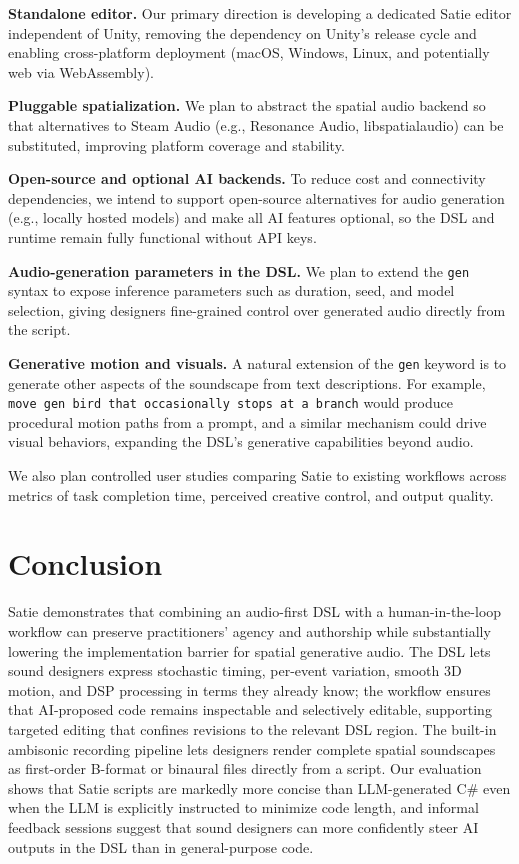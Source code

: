 \documentclass[sigconf,anonymous,review]{nimeart}
\begin{document}
\textbf{Standalone editor.} Our primary direction is developing a dedicated Satie editor independent of Unity, removing the dependency on Unity's release cycle and enabling cross-platform deployment (macOS, Windows, Linux, and potentially web via WebAssembly).

\textbf{Pluggable spatialization.} We plan to abstract the spatial audio backend so that alternatives to Steam Audio (e.g., Resonance Audio, libspatialaudio) can be substituted, improving platform coverage and stability.

\textbf{Open-source and optional AI backends.} To reduce cost and connectivity dependencies, we intend to support open-source alternatives for audio generation (e.g., locally hosted models) and make all AI features optional, so the DSL and runtime remain fully functional without API keys.

\textbf{Audio-generation parameters in the DSL.} We plan to extend the \texttt{gen} syntax to expose inference parameters such as duration, seed, and model selection, giving designers fine-grained control over generated audio directly from the script.

\textbf{Generative motion and visuals.} A natural extension of the \texttt{gen} keyword is to generate other aspects of the soundscape from text descriptions. For example, \texttt{move gen bird that occasionally stops at a branch} would produce procedural motion paths from a prompt, and a similar mechanism could drive visual behaviors, expanding the DSL's generative capabilities beyond audio.

We also plan controlled user studies comparing Satie to existing workflows across metrics of task completion time, perceived creative control, and output quality.

\section{Conclusion}

Satie demonstrates that combining an audio-first DSL with a human-in-the-loop workflow can preserve practitioners' agency and authorship while substantially lowering the implementation barrier for spatial generative audio. The DSL lets sound designers express stochastic timing, per-event variation, smooth 3D motion, and DSP processing in terms they already know; the workflow ensures that AI-proposed code remains inspectable and selectively editable, supporting targeted editing that confines revisions to the relevant DSL region. The built-in ambisonic recording pipeline lets designers render complete spatial soundscapes as first-order B-format or binaural files directly from a script. Our evaluation shows that Satie scripts are markedly more concise than LLM-generated C\# even when the LLM is explicitly instructed to minimize code length, and informal feedback sessions suggest that sound designers can more confidently steer AI outputs in the DSL than in general-purpose code.
\end{document}
